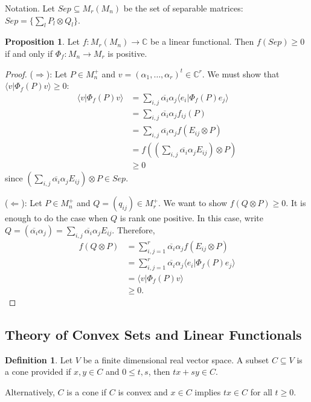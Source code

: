 \documentclass[12pt]{article}
\theoremstyle{definition}
\newtheorem*{proposition}{Proposition}
\newtheorem*{definition}{Definition}
\newcommand{\C}{\mathbb{C}}
\begin{document}
Notation. Let $Sep \subseteq M_r(M_n)$ be the set of separable matrices: $Sep=\{\sum_l P_l \otimes Q_l\}$.

\begin{proposition}
Let $f:M_r(M_n) \to \C$ be a linear functional. Then $f(Sep) \geq 0$ if and only if $\Phi_f:M_n \to M_r$ is positive.
\end{proposition}

\begin{proof}
($\Rightarrow$): Let $P \in M_n^+$ and $v=(\alpha_1,\ldots,\alpha_r)^t \in \C^r$. We must show that $\langle v|\Phi_f(P)v\rangle \geq 0$:
\begin{align*}
\langle v|\Phi_f(P)v\rangle &= \sum_{i,j} \overline{\alpha_i}\alpha_j \langle e_i|\Phi_f(P)e_j\rangle \\
&= \sum_{i,j} \overline{\alpha_i}\alpha_j f_{ij}(P) \\
&= \sum_{i,j} \overline{\alpha_i}\alpha_j f(E_{ij} \otimes P) \\
&= f\left(\left(\sum_{i,j} \overline{\alpha_i}\alpha_j E_{ij}\right) \otimes P\right) \\
&\geq 0
\end{align*}
since $\left(\sum_{i,j} \overline{\alpha_i}\alpha_j E_{ij}\right) \otimes P \in Sep$.

($\Leftarrow$): Let $P \in M_n^+$ and $Q=(q_{ij}) \in M_r^+$. We want to show $f(Q \otimes P) \geq 0$. It is enough to do the case when $Q$ is rank one positive. In this case, write $Q=(\overline{\alpha_i}\alpha_j)=\sum_{i,j} \overline{\alpha_i}\alpha_j E_{ij}$. Therefore,
\begin{align*}
f(Q \otimes P) &= \sum_{i,j=1}^r \overline{\alpha_i}\alpha_j f(E_{ij} \otimes P) \\
&= \sum_{i,j=1}^r \overline{\alpha_i}\alpha_j \langle e_i|\Phi_f(P)e_j\rangle \\
&= \langle v|\Phi_f(P)v\rangle \\
&\geq 0.
\end{align*}
\end{proof}

\subsection{Theory of Convex Sets and Linear Functionals}

\begin{definition}
Let $V$ be a finite dimensional real vector space. A subset $C \subseteq V$ is a cone provided if $x,y \in C$ and $0 \leq t,s$, then $tx+sy \in C$.
\end{definition}
Alternatively, $C$ is a cone if $C$ is convex and $x \in C$ implies $tx \in C$ for all $t \geq 0$.
\end{document}
